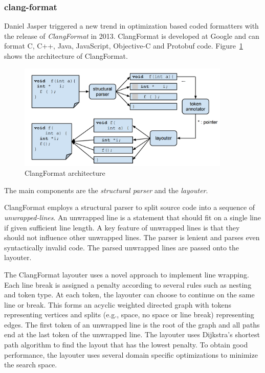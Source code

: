 \subsubsection{clang-format}
Daniel Jasper triggered a new trend in optimization based coded formatters with the release of \emph{ClangFormat}\autocite{jasper_clang-format_2014} in 2013.
ClangFormat is developed at Google and can format C, C++, Java, JavaScript, Objective-C and Protobuf code.
Figure~\ref{fig:clang_format} shows the architecture of ClangFormat.
\begin{figure}
  \centering
  \includegraphics[width=0.9\textwidth]{img/clang-format.png}
  \caption{ClangFormat architecture}
  \label{fig:clang_format}
\end{figure}
The main components are the \emph{structural parser} and the \emph{layouter}.

ClangFormat employs a structural parser to split source code into a sequence of \emph{unwrapped-lines}.
An unwrapped line is a statement that should fit on a single line if given sufficient line length.
A key feature of unwrapped lines is that they should not influence other unwrapped lines.
The parser is lenient and parses even syntactically invalid code.
The parsed unwrapped lines are passed onto the layouter.

The ClangFormat layouter uses a novel approach to implement line wrapping.
Each line break is assigned a penalty according to several rules such as nesting and token type.
At each token, the layouter can choose to continue on the same line or break.
This forms an acyclic weighted directed graph with tokens representing vertices and splits (e.g., space, no space or line break) representing edges.
The first token of an unwrapped line is the root of the graph and all paths end at the last token of the unwrapped line.
The layouter uses Dijkstra's\autocite{dijkstra_note_1959} shortest path algorithm to find the layout that has the lowest penalty.
To obtain good performance, the layouter uses several domain specific optimizations to minimize the search space.

